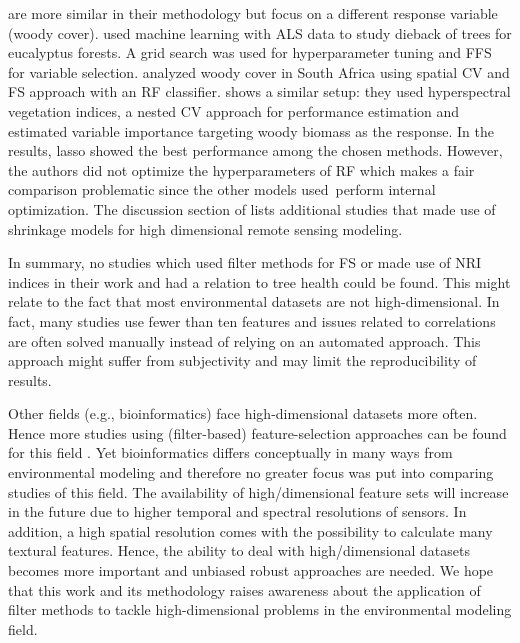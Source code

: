 \documentclass[remotesensing,article,submit,moreauthors,pdftex]{Definitions/mdpi}
\begin{document}
\cite{shendryk2016, ludwig2019} are more similar in their methodology but focus on a different response variable (woody cover).
\cite{shendryk2016} used machine learning with \ac{ALS} data to study dieback of trees for eucalyptus forests.
A grid search was used for hyperparameter tuning and \ac{FFS} for variable selection.
\cite{ludwig2019} analyzed woody cover in South Africa using spatial \ac{CV} and \ac{FS} approach \cite{meyer2018} with an RF classifier.
\cite{zandler2015} shows a similar setup: they used hyperspectral vegetation indices, a nested CV approach for performance estimation and estimated variable importance targeting woody biomass as the response.
In the results, lasso showed the best performance among the chosen methods.
However, the authors did not optimize the hyperparameters of RF which makes a fair comparison problematic since the other models used\ perform internal optimization.
The discussion section of \cite{zandler2015} lists additional studies that made use of shrinkage models for high dimensional remote sensing modeling.

In summary, no studies which used filter methods for \ac{FS} or made use of \ac{NRI} indices in their work and had a relation to tree health could be found.
This might relate to the fact that most environmental datasets are not high-dimensional.
In fact, many studies use fewer than ten features and issues related to correlations are often solved manually instead of relying on an automated approach.
This approach might suffer from subjectivity and may limit the reproducibility of results.

Other fields (e.g., bioinformatics) face high-dimensional datasets more often.
Hence more studies using (filter-based) feature-selection approaches can be found for this field \cite{guo2019, radovic2017}.
Yet bioinformatics differs conceptually in many ways from environmental modeling and therefore no greater focus was put into comparing studies of this field.
The availability of high\-/dimensional feature sets will increase in the future due to higher temporal and spectral resolutions of sensors.
In addition, a high spatial resolution comes with the possibility to calculate many textural features.
Hence, the ability to deal with high\-/dimensional datasets becomes more important and unbiased robust approaches are needed.
We hope that this work and its methodology raises awareness about the application of filter methods to tackle high-dimensional problems in the environmental modeling field.

\end{document}
